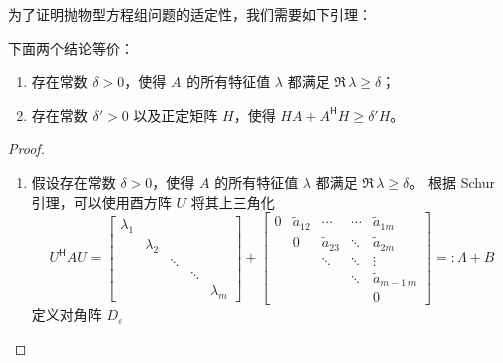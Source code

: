 为了证明抛物型方程组问题的适定性，我们需要如下引理：
\begin{lemma}\label{lemma:well-posed-1}
    下面两个结论等价：
    \begin{enumerate}
        \item 存在常数 $\delta >0$，使得 $A$ 的所有特征值 $\lambda$ 都满足 $\Re\, \lambda \ge \delta$；
        \item 存在常数 $\delta' >0$ 以及正定矩阵 $H$，使得 $H A + A^{\mathsf{H}} H \ge \delta' H$。
    \end{enumerate}
\end{lemma}

\begin{proof}
    \noindent
    \begin{enumerate}
        \item 假设存在常数 $\delta >0$，使得 $A$ 的所有特征值 $\lambda$ 都满足 $\Re\, \lambda \ge \delta$。
              根据 Schur 引理，可以使用酉方阵 $U$ 将其上三角化
              \[
                  U^\mathsf{H} A U
                  = \begin{bmatrix}
                      \lambda_1 &           &        &        &           \\
                                & \lambda_2 &        &        &           \\
                                &           & \ddots &        &           \\
                                &           &        & \ddots &           \\
                                &           &        &        & \lambda_m
                  \end{bmatrix}
                  +
                  \begin{bmatrix}
                      0 & \tilde{a}_{12} & \cdots         & \cdots & \tilde{a}_{1m}     \\
                        & 0              & \tilde{a}_{23} & \ddots & \tilde{a}_{2m}     \\
                        &                & \ddots         & \ddots & \vdots             \\
                        &                &                & \ddots & \tilde{a}_{m-1\,m} \\
                        &                &                &        & 0
                  \end{bmatrix}
                  =: \Lambda + B
              \]
              定义对角阵 $D_\varepsilon$
              \[
\]
\end{enumerate}
\end{proof}
